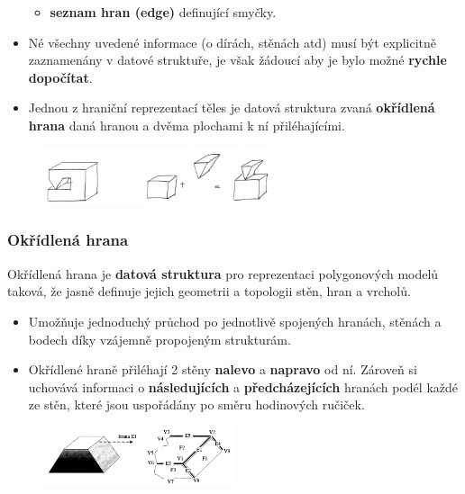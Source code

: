 \begin{itemize}
\begin{itemize}
		\item	\textbf{seznam hran (edge)} definující smyčky.
 	\end{itemize}
 	\item Né všechny uvedené informace (o dírách, stěnách atd) musí být explicitně zaznamenány v datové struktuře, je však žádoucí aby je bylo možné \textbf{rychle dopočítat}.
 	\item Jednou z hraniční reprezentací těles je datová struktura zvaná \textbf{okřídlená hrana} daná hranou a dvěma plochami k ní přiléhajícími.
 \end{itemize}

\begin{figure}[H]
	\centering
	\includegraphics[width=0.6\textwidth]{assets/4_hranicnic_manifold}
\end{figure} 

\subsubsection{Okřídlená hrana}
Okřídlená hrana je \textbf{datová struktura} pro reprezentaci polygonových modelů taková, že jasně definuje jejich geometrii a topologii stěn, hran a vrcholů.

\begin{itemize}
\item Umožňuje jednoduchý průchod po jednotlivě spojených hranách, stěnách a bodech díky vzájemně propojeným strukturám.
\item Okřídlené hraně přiléhají 2 stěny \textbf{nalevo} a \textbf{napravo} od ní. Zároveň si uchovává informaci o \textbf{následujících} a \textbf{předcházejících} hranách podél každé ze stěn, které jsou uspořádány po směru hodinových ručiček.
\end{itemize}

\begin{figure}[H]
\centering
\includegraphics[width=0.5\textwidth]{assets/4_okridlena_hrana}
\end{figure} 

